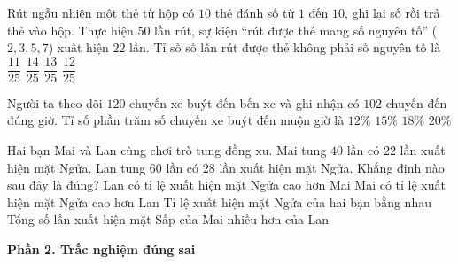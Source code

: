 \begin{ex} %
Rút ngẫu nhiên một thẻ từ hộp có $10$ thẻ đánh số từ $1$ đến $10$, ghi lại số rồi trả thẻ vào hộp. Thực hiện $50$ lần rút, sự kiện “rút được thẻ mang số nguyên tố” ($2, 3, 5, 7$) xuất hiện $22$ lần. Tỉ số số lần rút được thẻ không phải số nguyên tố là
\choice
{$\dfrac{11}{25}$}
{\True $\dfrac{14}{25}$}
{$\dfrac{13}{25}$}
{$\dfrac{12}{25}$}
\end{ex}

\begin{ex} %
Người ta theo dõi $120$ chuyến xe buýt đến bến xe và ghi nhận có $102$ chuyến đến đúng giờ. Tỉ số phần trăm số chuyến xe buýt đến muộn giờ là
\choice
{$12\%$}
{\True $15\%$}
{$18\%$}
{$20\%$}
\end{ex}

\begin{ex} %
Hai bạn Mai và Lan cùng chơi trò tung đồng xu. Mai tung $40$ lần có $22$ lần xuất hiện mặt Ngửa. Lan tung $60$ lần có $28$ lần xuất hiện mặt Ngửa. Khẳng định nào sau đây là đúng?
\choice
{Lan có tỉ lệ xuất hiện mặt Ngửa cao hơn Mai}
{\True Mai có tỉ lệ xuất hiện mặt Ngửa cao hơn Lan}
{Tỉ lệ xuất hiện mặt Ngửa của hai bạn bằng nhau}
{Tổng số lần xuất hiện mặt Sấp của Mai nhiều hơn của Lan}
\end{ex}

\textbf{Phần 2. Trắc nghiệm đúng sai}

